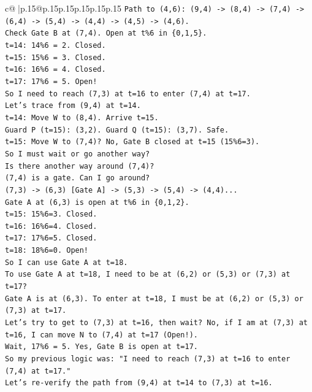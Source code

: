 \documentclass{article}
\begin{document}
{\begin{supertabular}{c@{$\;$}|p{.15\linewidth}@{}p{.15\linewidth}p{.15\linewidth}p{.15\linewidth}p{.15\linewidth}p{.15\linewidth}}
{{{\texttt{Path to (4,6): (9,4) {-}> (8,4) {-}> (7,4) {-}> (6,4) {-}> (5,4) {-}> (4,4) {-}> (4,5) {-}> (4,6).} \\
\texttt{Check Gate B at (7,4). Open at t\%6 in \{0,1,5\}.} \\
\texttt{t=14: 14\%6 = 2. Closed.} \\
\texttt{t=15: 15\%6 = 3. Closed.} \\
\texttt{t=16: 16\%6 = 4. Closed.} \\
\texttt{t=17: 17\%6 = 5. Open!} \\
\texttt{So I need to reach (7,3) at t=16 to enter (7,4) at t=17.} \\
\texttt{Let's trace from (9,4) at t=14.} \\
\texttt{t=14: Move W to (8,4). Arrive t=15.} \\
\texttt{Guard P (t=15): (3,2). Guard Q (t=15): (3,7). Safe.} \\
\texttt{t=15: Move W to (7,4)? No, Gate B closed at t=15 (15\%6=3).} \\
\texttt{So I must wait or go another way?} \\
\texttt{Is there another way around (7,4)?} \\
\texttt{(7,4) is a gate. Can I go around?} \\
\texttt{(7,3) {-}> (6,3) {[}Gate A{]} {-}> (5,3) {-}> (5,4) {-}> (4,4)...} \\
\texttt{Gate A at (6,3) is open at t\%6 in \{0,1,2\}.} \\
\texttt{t=15: 15\%6=3. Closed.} \\
\texttt{t=16: 16\%6=4. Closed.} \\
\texttt{t=17: 17\%6=5. Closed.} \\
\texttt{t=18: 18\%6=0. Open!} \\
\texttt{So I can use Gate A at t=18.} \\
\texttt{To use Gate A at t=18, I need to be at (6,2) or (5,3) or (7,3) at t=17?} \\
\texttt{Gate A is at (6,3). To enter at t=18, I must be at (6,2) or (5,3) or (7,3) at t=17.} \\
\texttt{Let's try to get to (7,3) at t=16, then wait? No, if I am at (7,3) at t=16, I can move N to (7,4) at t=17 (Open!).} \\
\texttt{Wait, 17\%6 = 5. Yes, Gate B is open at t=17.} \\
\texttt{So my previous logic was: "I need to reach (7,3) at t=16 to enter (7,4) at t=17."} \\
\texttt{Let's re{-}verify the path from (9,4) at t=14 to (7,3) at t=16.} \\
}}}
\end{supertabular}}
\end{document}
